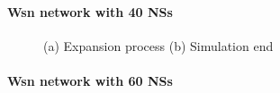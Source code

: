 \paragraph{Wsn network with 40 NSs}

\begin{figure}[H]
    \centering
    \caption{(a) Expansion process (b) Simulation end}
    \label{fig:foobar}
\end{figure}

\paragraph{Wsn network with 60 NSs}

